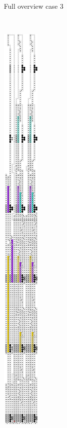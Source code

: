 \begin{figure}[H]
\begin{subfigure}[t]{0.2\textwidth}
                \caption{\label{fig:full_overview_case3_colored} Full overview case 3}
            \end{subfigure}%
            ~
            \begin{subfigure}[t]{0.2\textwidth}
                \centering
                \includegraphics[width=0.2\textwidth]{full_overview_case2_colored}

\end{subfigure}
\end{figure}
